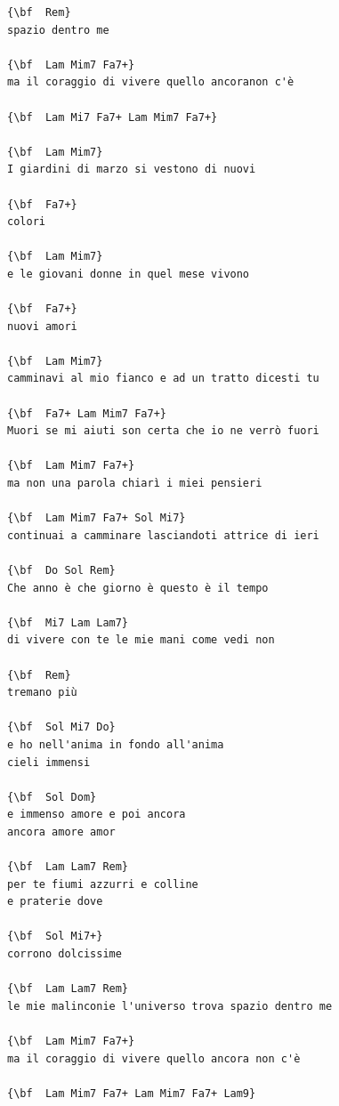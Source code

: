 \documentclass[a4paper]{article}
\begin{document}
\begin{Verbatim}[commandchars=\\\{\}]
{\bf  Rem}
spazio dentro me

{\bf  Lam Mim7 Fa7+}
ma il coraggio di vivere quello ancoranon c'è

{\bf  Lam Mi7 Fa7+ Lam Mim7 Fa7+}

{\bf  Lam Mim7}
I giardini di marzo si vestono di nuovi

{\bf  Fa7+}
colori

{\bf  Lam Mim7}
e le giovani donne in quel mese vivono

{\bf  Fa7+}
nuovi amori

{\bf  Lam Mim7}
camminavi al mio fianco e ad un tratto dicesti tu

{\bf  Fa7+ Lam Mim7 Fa7+}
Muori se mi aiuti son certa che io ne verrò fuori

{\bf  Lam Mim7 Fa7+}
ma non una parola chiarì i miei pensieri

{\bf  Lam Mim7 Fa7+ Sol Mi7}
continuai a camminare lasciandoti attrice di ieri

{\bf  Do Sol Rem}
Che anno è che giorno è questo è il tempo

{\bf  Mi7 Lam Lam7}
di vivere con te le mie mani come vedi non

{\bf  Rem}
tremano più

{\bf  Sol Mi7 Do}
e ho nell'anima in fondo all'anima
cieli immensi

{\bf  Sol Dom}
e immenso amore e poi ancora
ancora amore amor

{\bf  Lam Lam7 Rem}
per te fiumi azzurri e colline
e praterie dove

{\bf  Sol Mi7+}
corrono dolcissime

{\bf  Lam Lam7 Rem}
le mie malinconie l'universo trova spazio dentro me

{\bf  Lam Mim7 Fa7+}
ma il coraggio di vivere quello ancora non c'è

{\bf  Lam Mim7 Fa7+ Lam Mim7 Fa7+ Lam9}

\end{Verbatim}
\newpage
\end{document}

